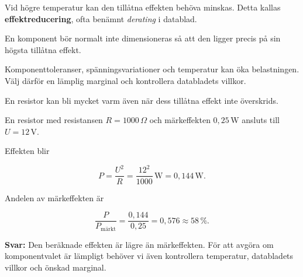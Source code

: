 \documentclass[
  swedish,
  11pt,
  a4paper,
  DIV=11,
  numbers=noendperiod,
  twoside,
  open=any]{scrreprt}
\begin{document}
Vid högre temperatur kan den tillåtna effekten behöva minskas. Detta
kallas \textbf{effektreducering}, ofta benämnt \emph{derating} i
datablad.

\begin{tcolorbox}[enhanced jigsaw, arc=.35mm, bottomrule=.15mm, bottomtitle=1mm, breakable, colback=white, colbacktitle=quarto-callout-important-color!10!white, colframe=quarto-callout-important-color-frame, coltitle=black, left=2mm, leftrule=.75mm, opacityback=0, opacitybacktitle=0.6, rightrule=.15mm, title=\textcolor{quarto-callout-important-color}{\faExclamation}\hspace{0.5em}{Märkeffekten är en gräns, inte ett dimensioneringsmål}, titlerule=0mm, toprule=.15mm, toptitle=1mm]

En komponent bör normalt inte dimensioneras så att den ligger precis på
sin högsta tillåtna effekt.

Komponenttoleranser, spänningsvariationer och temperatur kan öka
belastningen. Välj därför en lämplig marginal och kontrollera
databladets villkor.

En resistor kan bli mycket varm även när dess tillåtna effekt inte
överskrids.

\end{tcolorbox}

\begin{tcolorbox}[enhanced jigsaw, arc=.35mm, bottomrule=.15mm, bottomtitle=1mm, breakable, colback=white, colbacktitle=quarto-callout-note-color!10!white, colframe=quarto-callout-note-color-frame, coltitle=black, left=2mm, leftrule=.75mm, opacityback=0, opacitybacktitle=0.6, rightrule=.15mm, title={Exempel: klarar resistorn belastningen?}, titlerule=0mm, toprule=.15mm, toptitle=1mm]

En resistor med resistansen \(R = 1000\,\Omega\) och märkeffekten
\(0{,}25\,\mathrm{W}\) ansluts till \(U = 12\,\mathrm{V}\).

Effekten blir

\[
P = \frac{U^2}{R}
= \frac{12^2}{1000}\,\mathrm{W}
= 0{,}144\,\mathrm{W}.
\]

Andelen av märkeffekten är

\[
\frac{P}{P_\mathrm{märkt}}
= \frac{0{,}144}{0{,}25}
= 0{,}576
\approx 58\,\%.
\]

\textbf{Svar:} Den beräknade effekten är lägre än märkeffekten. För att
avgöra om komponentvalet är lämpligt behöver vi även kontrollera
temperatur, databladets villkor och önskad marginal.

\end{tcolorbox}
\end{document}
